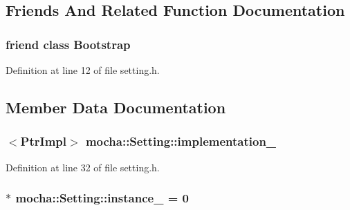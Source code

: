 \subsection{Friends And Related Function Documentation}
\hypertarget{classmocha_1_1_setting_aa966551cf4c3c99d5e0da9175856fb7e}{
\subsubsection[{Bootstrap}]{\setlength{\rightskip}{0pt plus 5cm}friend class {\bf Bootstrap}}}
\label{classmocha_1_1_setting_aa966551cf4c3c99d5e0da9175856fb7e}


Definition at line 12 of file setting.h.



\subsection{Member Data Documentation}
\hypertarget{classmocha_1_1_setting_a07d6568a1ff8ac8a969d5c3c3b6ba6fe}{
\subsubsection[{implementation\_\-}]{$<${\bf PtrImpl}$>$ {\bf mocha::Setting::implementation\_\-}}}
\label{classmocha_1_1_setting_a07d6568a1ff8ac8a969d5c3c3b6ba6fe}


Definition at line 32 of file setting.h.

\hypertarget{classmocha_1_1_setting_a37e8e9f7b64d857acf07758852747961}{
\subsubsection[{instance\_\-}]{ $\ast$ {\bf mocha::Setting::instance\_\-} = 0}}
\label{classmocha_1_1_setting_a37e8e9f7b64d857acf07758852747961}


